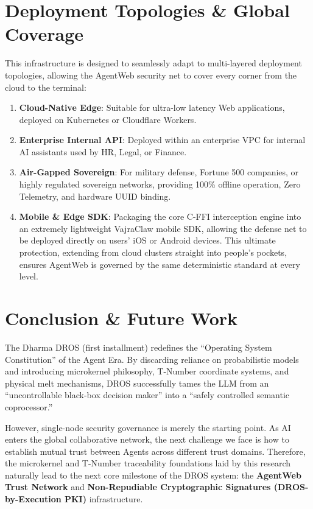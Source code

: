 \documentclass[conference]{IEEEtran}
\begin{document}
\section{Deployment Topologies \& Global Coverage}
This infrastructure is designed to seamlessly adapt to multi-layered deployment topologies, allowing the AgentWeb security net to cover every corner from the cloud to the terminal:
\begin{enumerate}
    \item \textbf{Cloud-Native Edge}: Suitable for ultra-low latency Web applications, deployed on Kubernetes or Cloudflare Workers.
    \item \textbf{Enterprise Internal API}: Deployed within an enterprise VPC for internal AI assistants used by HR, Legal, or Finance.
    \item \textbf{Air-Gapped Sovereign}: For military defense, Fortune 500 companies, or highly regulated sovereign networks, providing 100\% offline operation, Zero Telemetry, and hardware UUID binding.
    \item \textbf{Mobile \& Edge SDK}: Packaging the core C-FFI interception engine into an extremely lightweight VajraClaw mobile SDK, allowing the defense net to be deployed directly on users' iOS or Android devices. This ultimate protection, extending from cloud clusters straight into people's pockets, ensures AgentWeb is governed by the same deterministic standard at every level.
\end{enumerate}

\section{Conclusion \& Future Work}
The Dharma DROS (first installment) redefines the ``Operating System Constitution'' of the Agent Era. By discarding reliance on probabilistic models and introducing microkernel philosophy, T-Number coordinate systems, and physical melt mechanisms, DROS successfully tames the LLM from an ``uncontrollable black-box decision maker'' into a ``safely controlled semantic coprocessor.''

However, single-node security governance is merely the starting point. As AI enters the global collaborative network, the next challenge we face is how to establish mutual trust between Agents across different trust domains. Therefore, the microkernel and T-Number traceability foundations laid by this research naturally lead to the next core milestone of the DROS system: the \textbf{AgentWeb Trust Network} and \textbf{Non-Repudiable Cryptographic Signatures (DROS-by-Execution PKI)} infrastructure.
\end{document}
